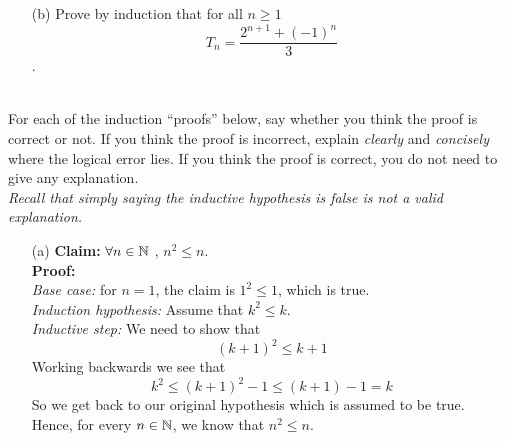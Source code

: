 \documentclass[11pt]{article}
\newif\ifsolutions
\begin{document}
\begin{qunlist}
\begin{itemize}
\item[(b)] Prove by induction that for all $n \geq 1$
\[ T_n = \frac{2^{n+1}+(-1)^n}{3} \]. 

\ifsolutions
\textbf{Solutions:} (Strong Induction) $P(n)$ asserts that $T_n = \frac{2^{n+1}+(-1)^n}{3}$. 
We prove the statement by (strong) induction on $n$, showing that $P(n-2) \wedge P(n-1) \implies P(n)$. \\
\underline{Base cases:} $T_1 = 1$ as there is exactly one way to tile a $2 \times 1$ board, using tile \textbf{B}.
A $2 \times 2$ board can be tiled in exactly three different ways using the tiles \textbf{AA, BB} and \textbf{C},
so $T_2 = 3$. The base cases are true as $P(1)=T_1=1=(2^2-1)/3$ and $P(2)=T_2=3=(2^3+1)/3$.\\
\underline{Induction Hypothesis:} Assume $P(n-1)$ and $P(n-2)$ are true. \\
\underline{Inductive step:} Using the recurrence relation derived in part (a), we have,
\begin{align*} 
T_n &= T_{n-1} + 2T_{n-2} \\
&= \frac{2^n + (-1)^{n-1}}{3}+2\cdot\frac{2^{n-1}+(-1)^{n-2}}{3}  &\text{[by induction hypothesis]} \\
&= \frac{2^{n+1}+(-1)^{n-2}(2-1)}{3} \\
&= \frac{2^{n+1}+(-1)^n}{3}  &\text{[as } (-1)^{n-2} = (-1)^n \text{]} \\
\end{align*}
The claim is therefore true by (strong) induction for all natural numbers $n \geq 1$.
\fi


\end{itemize}





 \\
For each of the induction ``proofs'' below, say whether you think the proof is correct or not.
If you think the proof is incorrect, 
explain \textit{clearly} and \textit{concisely} where the logical error lies.
If you think the proof is correct, you do not need to give any explanation. \\
\textit{Recall that simply saying the inductive hypothesis is false is not a valid explanation.}

\begin{itemize}
\item[(a)] \textbf{Claim:} $\forall n \in \mathbb{N}$ , $n^2 \leq n$. \\
\textbf{Proof:} \\
\textit{Base case:} for $n = 1$, the claim is $1^2 \leq 1$, which is true. \\
\textit{Induction hypothesis:} Assume that $k^2 \leq k$. \\
\textit{Inductive step:} We need to show that 
\[ (k+1)^2 \leq k+1\]
Working backwards we see that 
\[ k^2 \leq (k+1)^2 - 1 \leq (k+1) - 1 = k \]
So we get back to our original hypothesis which is assumed to be true.\\
Hence, for every $n \in \mathbb{N}$, we know that $n^2 \leq n$. 


\end{itemize}
\end{qunlist}
\end{document}
